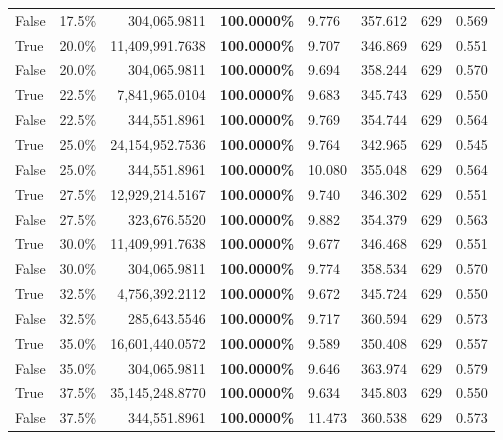 \begin{table}[H]
\begin{tabular}{|m{}| m{}| r | R{0.13\textwidth}| R{0.09\textwidth}| R{0.09\textwidth}| R{0.09\textwidth}| R{0.11\textwidth}}
False & 17.5\% & 304,065.9811 & \bfseries \color{red} 100.0000\% & 9.776 & 357.612 & 629 & 0.569 \\
True & 20.0\% & 11,409,991.7638 & \bfseries \color{red} 100.0000\% & 9.707 & 346.869 & 629 & 0.551 \\
False & 20.0\% & 304,065.9811 & \bfseries \color{red} 100.0000\% & 9.694 & 358.244 & 629 & 0.570 \\
True & 22.5\% & 7,841,965.0104 & \bfseries \color{red} 100.0000\% & 9.683 & 345.743 & 629 & 0.550 \\
False & 22.5\% & 344,551.8961 & \bfseries \color{red} 100.0000\% & 9.769 & 354.744 & 629 & 0.564 \\
True & 25.0\% & 24,154,952.7536 & \bfseries \color{red} 100.0000\% & 9.764 & 342.965 & 629 & 0.545 \\
False & 25.0\% & 344,551.8961 & \bfseries \color{red} 100.0000\% & 10.080 & 355.048 & 629 & 0.564 \\
True & 27.5\% & 12,929,214.5167 & \bfseries \color{red} 100.0000\% & 9.740 & 346.302 & 629 & 0.551 \\
False & 27.5\% & 323,676.5520 & \bfseries \color{red} 100.0000\% & 9.882 & 354.379 & 629 & 0.563 \\
True & 30.0\% & 11,409,991.7638 & \bfseries \color{red} 100.0000\% & 9.677 & 346.468 & 629 & 0.551 \\
False & 30.0\% & 304,065.9811 & \bfseries \color{red} 100.0000\% & 9.774 & 358.534 & 629 & 0.570 \\
True & 32.5\% & 4,756,392.2112 & \bfseries \color{red} 100.0000\% & 9.672 & 345.724 & 629 & 0.550 \\
False & 32.5\% & \color{red} 285,643.5546 & \bfseries \color{red} 100.0000\% & 9.717 & 360.594 & 629 & 0.573 \\
True & 35.0\% & 16,601,440.0572 & \bfseries \color{red} 100.0000\% & 9.589 & 350.408 & 629 & 0.557 \\
False & 35.0\% & 304,065.9811 & \bfseries \color{red} 100.0000\% & 9.646 & 363.974 & 629 & 0.579 \\
True & 37.5\% & 35,145,248.8770 & \bfseries \color{red} 100.0000\% & 9.634 & 345.803 & 629 & 0.550 \\
False & 37.5\% & 344,551.8961 & \bfseries \color{red} 100.0000\% & 11.473 & 360.538 & 629 & 0.573 \\

\end{tabular}
\end{table}
